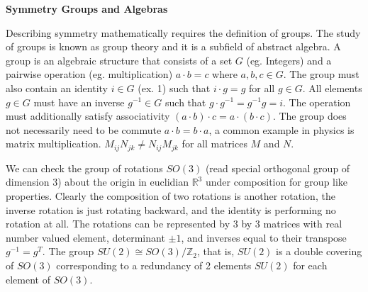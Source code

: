 \textbf{Symmetry Groups and Algebras} \cite{groups}

Describing symmetry mathematically requires the definition of groups. The study of groups is known as group
theory and it is a subfield of abstract algebra. A group
is an algebraic structure that consists of a set $G$ (eg. Integers) and a pairwise operation (eg. multiplication) 
$a\cdot b = c$ where $a,b, c\in G$. The group must also contain an identity $i \in G$ (ex. 1) such that $i\cdot g = g$ for all $g\in G$.
All elements $g\in G$ must have an inverse $g^{-1} \in G$ such that $g \cdot g^{-1} = g^{-1} g = i$. The operation must 
additionally satisfy associativity $(a\cdot b) \cdot c = a \cdot (b \cdot c)$. The group does not necessarily
need to be commute $a\cdot b = b \cdot a$, a common example in physics is matrix multiplication. $M_{ij}N_{jk} \neq N_{ij}M_{jk}$ 
for all matrices $M$ and $N$. 

We can check the group of rotations $SO(3)$ (read special orthogonal group of
dimension 3) about the origin in euclidian $\mathbb{R}^3$ under composition for group like properties.
Clearly the composition of two rotations is another rotation, the inverse rotation is 
just rotating backward, and the identity is performing no rotation at all. 
The rotations can be represented by 3 by 3 matrices with real number valued element, determinant $\pm 1$, 
and inverses equal to their transpose $g^{-1}=g^T$. The group $SU(2) \cong SO(3) / \mathbb{Z}_2$, that is, $SU(2)$ is a double
 covering of $SO(3)$ corresponding to a redundancy of 2 elements $SU(2)$ for each element of $SO(3)$.

